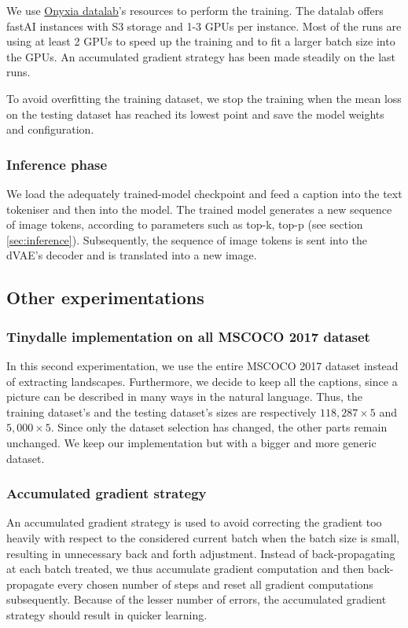 \documentclass{article}
\begin{document}
\begin{multicols}{2}
We use \href{https://datalab.sspcloud.fr/}{Onyxia datalab}'s resources to perform the training. The datalab offers fastAI instances with S3 storage and 1-3 GPUs per instance. Most of the runs are using at least 2 GPUs to speed up the training and to fit a larger batch size into the GPUs. An accumulated gradient strategy has been made steadily on the last runs.

To avoid overfitting the training dataset, we stop the training when the mean loss on the testing dataset has reached its lowest point and save the model weights and configuration.

\subsubsection{Inference phase}

We load the adequately trained-model checkpoint and feed a caption into the text tokeniser and then into the model. The trained model generates a new sequence of image tokens, according to parameters such as top-k, top-p (see section \ref{sec:inference}). Subsequently, the sequence of image tokens is sent into the dVAE's decoder and is translated into a new image.

\subsection{Other experimentations}

\subsubsection{Tinydalle implementation on all MSCOCO 2017 dataset}

In this second experimentation, we use the entire MSCOCO 2017 dataset instead of extracting landscapes. Furthermore, we decide to keep all the captions, since a picture can be described in many ways in the natural language. Thus, the training dataset's and the testing dataset's sizes are respectively $118,287\times 5$ and $5,000 \times 5$.
Since only the dataset selection has changed, the other parts remain unchanged. We keep our implementation but with a bigger and more generic dataset.

\subsubsection{Accumulated gradient strategy}

An accumulated gradient strategy is used to avoid correcting the gradient too heavily with respect to the considered current batch when the batch size is small, resulting in unnecessary back and forth adjustment. Instead of back-propagating at each batch treated, we thus accumulate gradient computation and then back-propagate every chosen number of steps and reset all gradient computations subsequently. Because of the lesser number of errors, the accumulated gradient strategy should result in quicker learning.


\end{multicols}
\end{document}
